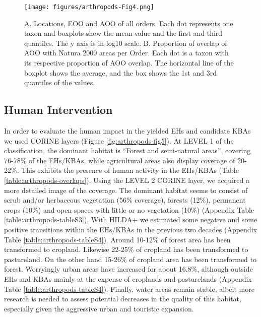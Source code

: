    \begin{figure}[h]
      \centering
      \texttt{[image: figures/arthropods-Fig4.png]}
      \caption[AOO, EOO and N2K overlaps per order]{A. Locations, EOO and AOO of all orders. Each dot represents one taxon and boxplots show the mean value and the first and third quantiles. The y axis is in log10 scale. B. Proportion of overlap of AOO with Natura 2000 areas per Order. Each dot is a taxon with its respective proportion of AOO overlap. The horizontal line of the boxplot shows the average, and the box shows the 1st and 3rd quantiles of the values.}
      \label{fig:arthropods-fig4}
   \end{figure}

    \subsection{Human Intervention}
    \label{subsec:arthropods-human-intervention}


In order to evaluate the human impact in the yielded EHs and candidate KBAs we
used CORINE layers (Figure \ref{fig:arthropods-fig5}). At LEVEL 1 of the classification, the dominant
habitat is “Forest and semi-natural areas”, covering ~ 76-78\% of the EHs/KBAs,
while agricultural areas also display coverage of 20-22\%. This exhibits the
presence of human activity in the EHs/KBAs (Table \ref{table:arthropods-overlaps}). Using the LEVEL 2 CORINE
layer, we acquired a more detailed image of the coverage. The dominant habitat
seems to consist of scrub and/or herbaceous vegetation  (56\% coverage),
forests (12\%), permanent crops (10\%) and open spaces with little or
no vegetation (10\%) (Appendix Table \ref{table:arthropods-tableS3}). With HILDA+ we
estimated some negative and some positive transitions within the EHs/KBAs in
the previous two decades (Appendix Table \ref{table:arthropods-tableS4}). Around 10-12\% of
forest area has been transformed to cropland. Likewise 22-25\% of cropland has
been transformed to pastureland. On the other hand 15-26\% of cropland area has
been transformed to forest. Worryingly urban areas have increased for about 16.8\%,
although outside EHs and KBAs mainly at the expense of croplands and
pasturelands (Appendix Table \ref{table:arthropods-tableS4}). Finally, water areas remain
stable, albeit more research is needed to assess potential decreases in the
quality of this habitat, especially given the aggressive urban and touristic expansion.


